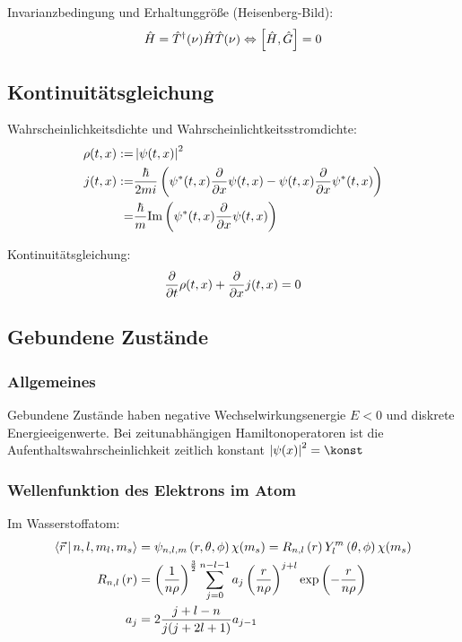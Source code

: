 \documentclass[11pt]{article}
\numberwithin{equation}{section}
\begin{document}
        Invarianzbedingung und Erhaltunggröße (Heisenberg-Bild):
        \begin{equation}
          \hat{H} =\hat{T}^\dagger(\nu)\hat{H} \hat{T}(\nu) \Leftrightarrow \left[\hat{H},\hat{G}\right] = 0
        \end{equation}

    \subsection{Kontinuitätsgleichung}
      Wahrscheinlichkeitsdichte und Wahrscheinlichtkeitsstromdichte:
      \begin{equation}
        \begin{aligned}
          \rho(t,x) :=& \left|\psi(t,x)\right|^2 \\
          j(t,x) :=& \frac{\hbar}{2mi}\left(
            \psi^*(t,x)\frac{\partial }{\partial x}\psi(t,x) - \psi(t,x)\frac{\partial }{\partial x}\psi^*(t,x)
          \right) \\
          =& \frac{\hbar}{m} \mathrm{Im}\left(
            \psi^*(t,x) \frac{\partial }{\partial x}\psi(t,x)
          \right)\\
        \end{aligned}
      \end{equation}

      Kontinuitätsgleichung:
      \begin{equation}
        \frac{\partial }{\partial t}\rho(t,x) + \frac{\partial }{\partial x}j(t,x) = 0
      \end{equation}

    \subsection{Gebundene Zustände}
      \subsubsection{Allgemeines}
        Gebundene Zustände haben negative Wechselwirkungsenergie $E<0$ und diskrete Energieeigenwerte. Bei zeitunabhängigen Hamiltonoperatoren ist die Aufenthaltswahrscheinlichkeit zeitlich konstant $\left|\psi(x)\right|^2=\konst$

      \subsubsection{Wellenfunktion des Elektrons im Atom}
        Im Wasserstoffatom:
        \begin{equation}
          \begin{aligned}
            \Braket{\vec{r}|n,l,m_l,m_s} &= \psi_{n,l,m}\left(r,\theta,\phi\right)\chi(m_s)
            = R_{n,l}\left(r\right) Y_l^m\left(\theta,\phi\right)\chi(m_s) \\
            R_{n,l}\left(r\right)
            &= \left(\frac{1}{n\rho}\right)^{\frac{3}{2}}
            \sum_{j=0}^{n-l-1} a_j \left(\frac{r}{n\rho}\right)^{j+l} \exp\left({-\frac{r}{n\rho}}\right) \\
            a_j &= 2\frac{j+l-n}{j(j+2l+1)} a_{j-1} \\
          \end{aligned}
        \end{equation}
\end{document}
